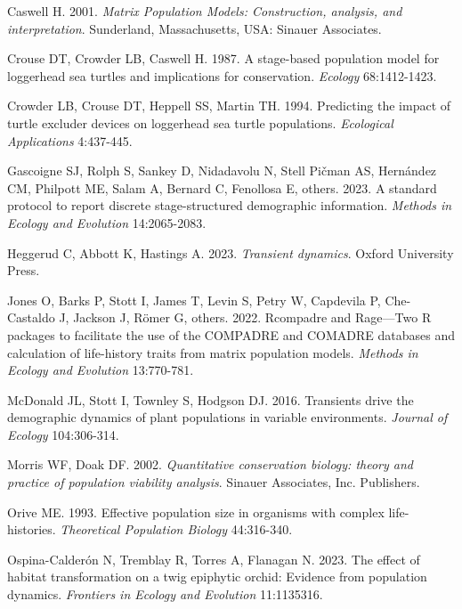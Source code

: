 \documentclass[
  12pt,
  letterpaper,
]{book}
\newlength{\cslhangindent}
\newenvironment{CSLReferences}[2] %
 {\begin{list}{}{%
  \setlength{\itemindent}{0pt}
  \setlength{\leftmargin}{0pt}
  \setlength{\parsep}{0pt}
  \ifodd #1
   \setlength{\leftmargin}{\cslhangindent}
   \setlength{\itemindent}{-1\cslhangindent}
  \fi
  \setlength{\itemsep}{#2\baselineskip}}}
 {\end{list}}
\begin{document}
\label{refs}
\begin{CSLReferences}{1}{0}
Caswell H. 2001. \emph{Matrix {P}opulation {M}odels: Construction,
analysis, and interpretation}. Sunderland, Massachusetts, USA: Sinauer
Associates.

Crouse DT, Crowder LB, Caswell H. 1987. A stage-based population model
for loggerhead sea turtles and implications for conservation.
\emph{Ecology} 68:1412-1423.

Crowder LB, Crouse DT, Heppell SS, Martin TH. 1994. Predicting the
impact of turtle excluder devices on loggerhead sea turtle populations.
\emph{Ecological Applications} 4:437-445.

Gascoigne SJ, Rolph S, Sankey D, Nidadavolu N, Stell Pičman AS,
Hernández CM, Philpott ME, Salam A, Bernard C, Fenollosa E, others.
2023. A standard protocol to report discrete stage-structured
demographic information. \emph{Methods in Ecology and Evolution}
14:2065-2083.

Heggerud C, Abbott K, Hastings A. 2023. \emph{Transient dynamics}.
Oxford University Press.

Jones O, Barks P, Stott I, James T, Levin S, Petry W, Capdevila P,
Che-Castaldo J, Jackson J, Römer G, others. 2022. Rcompadre and
Rage---Two R packages to facilitate the use of the COMPADRE and COMADRE
databases and calculation of life-history traits from matrix population
models. \emph{Methods in Ecology and Evolution} 13:770-781.

McDonald JL, Stott I, Townley S, Hodgson DJ. 2016. Transients drive the
demographic dynamics of plant populations in variable environments.
\emph{Journal of Ecology} 104:306-314.

Morris WF, Doak DF. 2002. \emph{Quantitative conservation biology:
theory and practice of population viability analysis}. Sinauer
Associates, Inc. Publishers.

Orive ME. 1993. Effective population size in organisms with complex
life-histories. \emph{Theoretical Population Biology} 44:316-340.

Ospina-Calderón N, Tremblay R, Torres A, Flanagan N. 2023. The effect of
habitat transformation on a twig epiphytic orchid: Evidence from
population dynamics. \emph{Frontiers in Ecology and Evolution}
11:1135316.


\end{CSLReferences}
\end{document}
